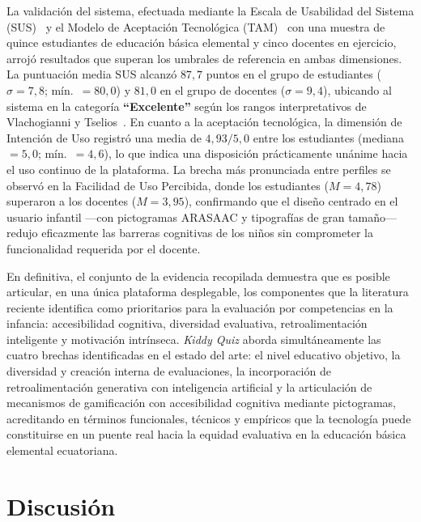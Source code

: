 La validación del sistema, efectuada mediante la Escala de Usabilidad del
Sistema (SUS)~\cite{brooke1996sus} y el Modelo de Aceptación Tecnológica
(TAM)~\cite{davis1989tam} con una muestra de quince estudiantes de educación
básica elemental y cinco docentes en ejercicio, arrojó resultados que superan
los umbrales de referencia en ambas dimensiones. La puntuación media SUS
alcanzó $87{,}7$ puntos en el grupo de estudiantes ($\sigma=7{,}8$;
mín.~$=80{,}0$) y $81{,}0$ en el grupo de docentes ($\sigma=9{,}4$), ubicando
al sistema en la categoría \textbf{``Excelente''} según los rangos
interpretativos de Vlachogianni y Tselios~\cite{vlachogianni2022sus}. En
cuanto a la aceptación tecnológica, la dimensión de Intención de Uso registró
una media de $4{,}93/5{,}0$ entre los estudiantes (mediana~$=5{,}0$;
mín.~$=4{,}6$), lo que indica una disposición prácticamente unánime hacia el
uso continuo de la plataforma. La brecha más pronunciada entre perfiles se
observó en la Facilidad de Uso Percibida, donde los estudiantes ($M=4{,}78$)
superaron a los docentes ($M=3{,}95$), confirmando que el diseño centrado en el
usuario infantil ---con pictogramas ARASAAC y tipografías de gran tamaño---
redujo eficazmente las barreras cognitivas de los niños sin comprometer la
funcionalidad requerida por el docente.

En definitiva, el conjunto de la evidencia recopilada demuestra que es posible
articular, en una única plataforma desplegable, los componentes que la
literatura reciente identifica como prioritarios para la evaluación por
competencias en la infancia: accesibilidad cognitiva, diversidad evaluativa,
retroalimentación inteligente y motivación intrínseca. \textit{Kiddy Quiz}
aborda simultáneamente las cuatro brechas identificadas en el estado del arte:
el nivel educativo objetivo, la diversidad y creación interna de evaluaciones,
la incorporación de retroalimentación generativa con inteligencia artificial y
la articulación de mecanismos de gamificación con accesibilidad cognitiva
mediante pictogramas, acreditando en términos funcionales, técnicos y empíricos
que la tecnología puede constituirse en un puente real hacia la equidad
evaluativa en la educación básica elemental ecuatoriana.

\section{Discusión}
\label{sec:discusion}

